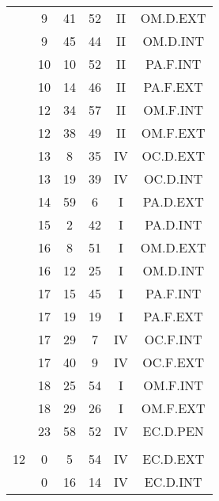\documentclass[12pt, a4paper]{article}
\begin{document}
\begin{multicols}{3}
{\begin{tabular}{c c c c c c}
	 	 	 	 & 9 & 41 & 52 & II & OM.D.EXT\\%
	 	 	 	 & 9 & 45 & 44 & II & OM.D.INT\\%
	 	 	 	 & 10 & 10 & 52 & II & PA.F.INT\\%
	 	 	 	 & 10 & 14 & 46 & II & PA.F.EXT\\%
	 	 	 	 & 12 & 34 & 57 & II & OM.F.INT\\%
	 	 	 	 & 12 & 38 & 49 & II & OM.F.EXT\\%
	 	 	 	 & 13 & 8 & 35 & IV & OC.D.EXT\\%
	 	 	 	 & 13 & 19 & 39 & IV & OC.D.INT\\%
	 	 	 	 & 14 & 59 & 6 & I & PA.D.EXT\\%
	 	 	 	 & 15 & 2 & 42 & I & PA.D.INT\\%
	 	 	 	 & 16 & 8 & 51 & I & OM.D.EXT\\%
	 	 	 	 & 16 & 12 & 25 & I & OM.D.INT\\%
	 	 	 	 & 17 & 15 & 45 & I & PA.F.INT\\%
	 	 	 	 & 17 & 19 & 19 & I & PA.F.EXT\\%
	 	 	 	 & 17 & 29 & 7 & IV & OC.F.INT\\%
	 	 	 	 & 17 & 40 & 9 & IV & OC.F.EXT\\%
	 	 	 	 & 18 & 25 & 54 & I & OM.F.INT\\%
	 	 	 	 & 18 & 29 & 26 & I & OM.F.EXT\\%
	 	 	 	 & 23 & 58 & 52 & IV & EC.D.PEN\\%
	 	 	 	 & & & & & \\%
	 	 	 	12 & 0 & 5 & 54 & IV & EC.D.EXT\\%
	 	 	 	 & 0 & 16 & 14 & IV & EC.D.INT\\%
	 	 \end{tabular}
 	}
\end{multicols}
\end{document}
